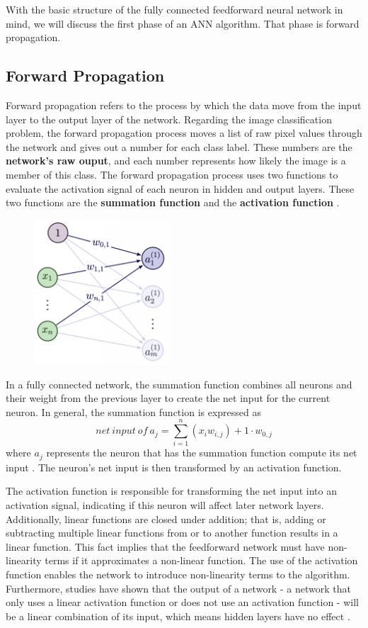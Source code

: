 With the basic structure of the fully connected feedforward neural network in mind, we will discuss the first phase of an ANN algorithm. That phase is forward propagation.

\subsection{Forward Propagation} \label{forwardprop_section}
Forward propagation refers to the process by which the data move from the input layer to the output layer of the network. Regarding the image classification problem, the forward propagation process moves a list of raw pixel values through the network and gives out a number for each class label. These numbers are the \textbf{network's raw ouput}, and each number represents how likely the image is a member of this class. The forward propagation process uses two functions to evaluate the activation signal of each neuron in hidden and output layers. These two functions are the \textbf{summation function} and the \textbf{activation function} \cite{taylor2017neural}.

\pagebreak
\begin{figure}
    \centering
    \includegraphics[width=2in]{figures/fp_diagram.png}
\end{figure}

\noindent In a fully connected network, the summation function combines all neurons and their weight from the previous layer to create the net input for the current neuron. In general, the summation function is expressed as \[net\ input\ of\ a_j = \sum_{i=1}^n (x_i w_{i,j}) + 1 \cdot w_{0,j}\] where $a_j$ represents the neuron that has the summation function compute its net input \cite{taylor2017neural}. The neuron's net input is then transformed by an activation function.

The activation function is responsible for transforming the net input into an activation signal, indicating if this neuron will affect later network layers. Additionally, linear functions are closed under addition; that is, adding or subtracting multiple linear functions from or to another function results in a linear function. This fact implies that the feedforward network must have non-linearity terms if it approximates a non-linear function. The use of the activation function enables the network to introduce non-linearity terms to the algorithm. Furthermore, studies have shown that the output of a network - a network that only uses a linear activation function or does not use an activation function - will be a linear combination of its input, which means hidden layers have no effect \cite{He_2015_ICCV}.

